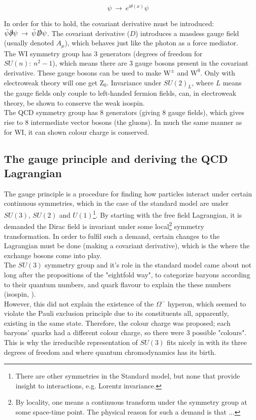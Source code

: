 \documentclass[11pt,a4paper]{article}
\begin{document}
\begin{equation}
	\psi \:\rightarrow\: e^{i\theta(x)}\psi
\end{equation} 

In order for this to hold, the covariant derivative must be introduced: $\bar{\psi}\slashed\partial\psi \:\rightarrow\: \bar{\psi}\slashed D\psi$. The covariant derivative ($D$) introduces a massless gauge field (usually denoted $A_\mu$), which behaves just like the photon as a force mediator.\\

The WI symmetry group has 3 generators (degrees of freedom for $SU(n):\:n^2-1$), which means there are 3 gauge bosons present in the covariant derivative. These gauge bosons can be used to make $\text{W}^\pm$ and $\text{W}^0$. Only with electroweak theory will one get $\text{Z}_ 0$. Invariance under $SU(2)_L$, where $L$ means the gauge fields only couple to left-handed fermion fields, can, in electroweak theory, be shown to conserve the weak isospin.\\

The QCD symmetry group has 8 generators (giving 8 gauge fields), which gives rise to 8 intermediate vector bosons (the gluons). In much the same manner as for WI, it can shown colour charge is conserved.

\subsection{The gauge principle and deriving the QCD Lagrangian}
The gauge principle is a procedure for finding how particles interact under certain continuous symmetries, which in the case of the standard model are under $SU(3)$, $SU(2)$ and $U(1)$\footnote{There are other symmetries in the Standard model, but none that provide insight to interactions, e.g. Lorentz invariance.}. By starting with the free field Lagrangian, it is demanded the Dirac field is invariant under some local\footnote{By locality, one means a continuous transform under the symmetry group at some space-time point. The physical reason for such a demand is that ...} symmetry transformation. In order to fulfil such a demand, certain changes to the Lagrangian must be done (making a covariant derivative), which is the where the exchange bosons come into play.\\

The $SU(3)$ symmetry group and it's role in the standard model came about not long after the propositions of the "eightfold way", to categorize baryons according to their quantum numbers, and quark flavour to explain the these numbers (isospin, ).\\
However, this did not explain the existence of the $\Omega^-$ hyperon, which seemed to violate the Pauli exclusion principle due to its constituents all, apparently, existing in the same state. Therefore, the colour charge was proposed; each baryons' quarks had a different colour charge, so there were 3 possible "colours". This is why the irreducible representation of $SU(3)$ fits nicely in with its three degrees of freedom and where quantum chromodynamics has its birth.\\
\end{document}
